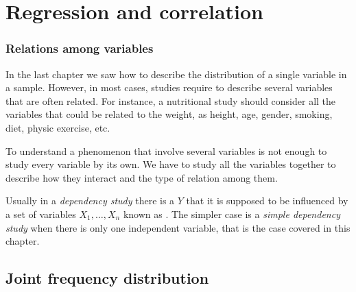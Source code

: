 \section{Regression and correlation}



\begin{frame}
\frametitle{Relations among variables}
In the last chapter we saw how to describe the distribution of a single variable in a sample. 
However, in most cases, studies require to describe several variables that are often related.
For instance, a nutritional study should consider all the variables that could be related to the weight, as height, age, gender, smoking, diet, physic exercise, etc.

To understand a phenomenon that involve several variables is not enough to study every variable by its own. 
We have to study all the variables together to describe how they interact and the type of relation among them. 

Usually in a \emph{dependency study} there is a  $Y$ that it is supposed to be influenced
by a set of variables $X_1,\ldots,X_n$ known as . 
The simpler case is a \emph{simple dependency study} when there is only one independent variable, that is the case covered in this chapter. 
\end{frame}


\subsection{Joint frequency distribution}

